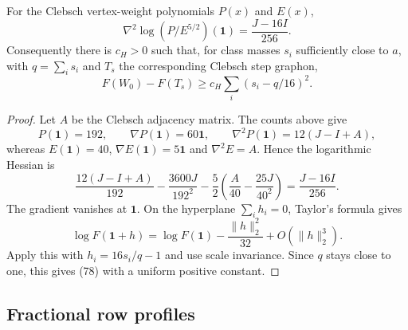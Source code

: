\begin{lemma}\label{lem:template-hessian}
For the Clebsch vertex-weight polynomials $P(x)$ and $E(x)$,
\[
 \nabla^2\log(P/E^{5/2})(\mathbf1)=\frac{J-16I}{256}.
\]
Consequently there is $c_H>0$ such that, for class masses $s_i$
sufficiently close to $a$, with $q=\sum_i s_i$ and $T_s$ the
corresponding Clebsch step graphon,
\begin{equation}\tag{78}\label{eq:hessian-defect}
 F(W_0)-F(T_s)\geq c_H\sum_i(s_i-q/16)^2.
\end{equation}
\end{lemma}
\begin{proof}
Let $A$ be the Clebsch adjacency matrix. The counts above give
\[
 P(\mathbf1)=192,\qquad\nabla P(\mathbf1)=60\mathbf1,\qquad
 \nabla^2P(\mathbf1)=12(J-I+A),
\]
whereas $E(\mathbf1)=40$, $\nabla E(\mathbf1)=5\mathbf1$ and
$\nabla^2E=A$. Hence the logarithmic Hessian is
\[
 \frac{12(J-I+A)}{192}-\frac{3600J}{192^2}
 -\frac52\left(\frac A{40}-\frac{25J}{40^2}\right)
 =\frac{J-16I}{256}.
\]
The gradient vanishes at $\mathbf1$. On the hyperplane $\sum_i h_i=0$,
Taylor's formula gives
\[
 \log F(\mathbf1+h)
 =\log F(\mathbf1)-\frac{\lVert h\rVert_2^2}{32}
     +O(\lVert h\rVert_2^3).
\]
Apply this with $h_i=16s_i/q-1$ and use scale invariance. Since $q$
stays close to one, this gives (78) with a uniform positive constant.
\end{proof}

\subsection{Fractional row profiles}

